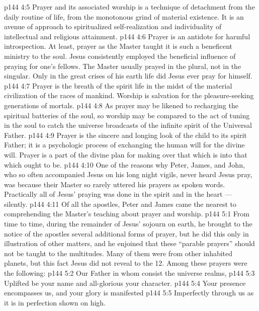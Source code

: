 \vs p144 4:5 Prayer and its associated worship is a technique of detachment from the daily routine of life, from the monotonous grind of material existence. It is an avenue of approach to spiritualized self\hyp{}realization and individuality of intellectual and religious attainment.
\vs p144 4:6 Prayer is an antidote for harmful introspection. At least, prayer as the Master taught it is such a beneficent ministry to the soul. Jesus consistently employed the beneficial influence of praying for one’s fellows. The Master usually prayed in the plural, not in the singular. Only in the great crises of his earth life did Jesus ever pray for himself.
\vs p144 4:7 Prayer is the breath of the spirit life in the midst of the material civilization of the races of mankind. Worship is salvation for the pleasure\hyp{}seeking generations of mortals.
\vs p144 4:8 As prayer may be likened to recharging the spiritual batteries of the soul, so worship may be compared to the act of tuning in the soul to catch the universe broadcasts of the infinite spirit of the Universal Father.
\vs p144 4:9 Prayer is the sincere and longing look of the child to its spirit Father; it is a psychologic process of exchanging the human will for the divine will. Prayer is a part of the divine plan for making over that which is into that which ought to be.
\vs p144 4:10 \pc One of the reasons why Peter, James, and John, who so often accompanied Jesus on his long night vigils, never heard Jesus pray, was because their Master so rarely uttered his prayers as spoken words. Practically all of Jesus’ praying was done in the spirit and in the heart --- silently.
\vs p144 4:11 Of all the apostles, Peter and James came the nearest to comprehending the Master’s teaching about prayer and worship.
\vs p144 5:1 From time to time, during the remainder of Jesus’ sojourn on earth, he brought to the notice of the apostles several additional forms of prayer, but he did this only in illustration of other matters, and he enjoined that these “parable prayers” should not be taught to the multitudes. Many of them were from other inhabited planets, but this fact Jesus did not reveal to the 12. Among these prayers were the following:
\vspace*{1ex}
\vs p144 5:2 Our Father in whom consist the universe realms,
\vs p144 5:3 \hsetoff Uplifted be your name and all\hyp{}glorious your character.
\vs p144 5:4 Your presence encompasses us, and your glory is manifested
\vs p144 5:5 \hsetoff Imperfectly through us as it is in perfection shown on high.
